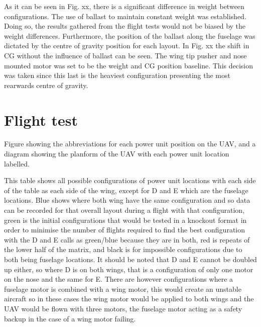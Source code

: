 \documentclass[../../main.tex]{subfiles}
\begin{document}


As it can be seen in Fig. xx, there is a significant difference in weight between configurations.
The use of ballast to maintain constant weight was established.
Doing so, the results gathered from the flight tests would not be biased by the weight differences.
Furthermore, the position of the ballast along the fuselage was dictated by the centre of gravity position for each layout.
In Fig. xx the shift in CG without the influence of ballast can be seen.
The wing tip pusher and nose mounted motor was set to be the weight and CG position baseline.
This decision was taken since this last is the heaviest configuration presenting the most rearwards centre of gravity. 


\section{Flight test} \label{sec:testing-and-evaluation:flight-test}

Figure showing the abbreviations for each power unit position on the UAV, and a diagram showing the planform of the UAV with each power unit location labelled. 


This table shows all possible configurations of power unit locations with each side of the table as each side of the wing, except for D and E which are the fuselage locations.
Blue shows where both wing have the same configuration and so data can be recorded for that overall layout during a flight with that configuration, green is the initial configurations that would be tested in a knockout format in order to minimise the number of flights required to find the best configuration with the D and E calls as green/blue because they are in both, red is repeats of the lower half of the matrix, and black is for impossible configurations due to both being fuselage locations.
It should be noted that D and E cannot be doubled up either, so where D is on both wings, that is a configuration of only one motor on the nose and the same for E.
There are however configurations where a fuselage motor is combined with a wing motor, this would create an unstable aircraft so in these cases the wing motor would be applied to both wings and the UAV would be flown with three motors, the fuselage motor acting as a safety backup in the case of a wing motor failing.
\end{document}

